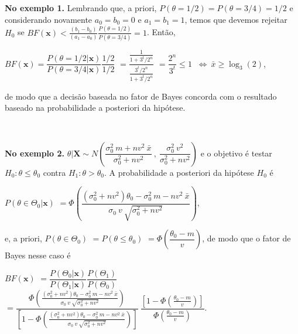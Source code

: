 \documentclass[
]{book}
\begin{document}
\textbf{No exemplo 1.} Lembrando que, a priori, \(P(\theta=1/2)=P(\theta=3/4)=1/2\) e considerando novamente \(a_0=b_0=0\) e \(a_1=b_1=1\), temos que devemos rejeitar \(H_0\) se \(BF(\boldsymbol x)<\frac{(b_1-b_0)}{(a_1-a_0)}\frac{P(\theta=1/2)}{P(\theta=3/4)}=1\). Então,

\(BF(\boldsymbol x)=\dfrac{P(\theta=1/2|\boldsymbol x)}{P(\theta=3/4|\boldsymbol x)}\dfrac{1/2}{1/2}\) \(=\dfrac{\frac{1}{1+3^t/2^n}}{\frac{3^t/2^n}{1+3^t/2^n}}\) \(=\dfrac{2^n}{3^t}\leq 1\) \(~\Longleftrightarrow~ \bar{x} \geq \log_3(2)\),

de modo que a decisão baseada no fator de Bayes concorda com o resultado baseado na probabilidade a posteriori da hipótese.

\(~\)

\textbf{No exemplo 2.} \(\theta|\boldsymbol X \sim N\left(\dfrac{{\sigma}_0^2~m+nv^2~\bar x}{{\sigma}_0^2+nv^2}~,~\dfrac{{\sigma}_0^2~v^2}{{\sigma}_0^2+nv^2}\right)\) e o objetivo é testar \(H_0: \theta\leq \theta_0\) contra \(H_1:\theta > \theta_0\). A probabilidade a posteriori da hipótese \(H_0\) é

\(P\left(\theta\in\Theta_0|\boldsymbol x\right)\)
\(= \Phi\left(\dfrac{({\sigma}_0^2+nv^2)\theta_0-{\sigma}_0^2~m-nv^2~\bar x}{{\sigma}_0~v~\sqrt{{\sigma}_ 0^2+nv^2}}\right)\),

e, a priori, \(P(\theta \in \Theta_0)\) \(=P(\theta \leq \theta_0)\) \(= \Phi\left(\dfrac{\theta_0-m}{v}\right)\), de modo que o fator de Bayes nesse caso é

\(BF(\boldsymbol x)\)
\(= \dfrac{P(\Theta_0|\boldsymbol x)}{P(\Theta_1|\boldsymbol x)} \dfrac{P(\Theta_1)}{P(\Theta_0)}\)
\(= \dfrac{\Phi\left(\frac{({\sigma}_0^2+nv^2)\theta_0-{\sigma}_0^2~m-nv^2~\bar x}{{\sigma}_0~v~\sqrt{{\sigma}_0^2+nv^2}}\right)}{\left[1-\Phi\left(\frac{({\sigma}_0^2+nv^2)\theta_0-{\sigma}_0^2~m-nv^2~\bar x}{{\sigma}_0~v~\sqrt{{\sigma}_0^2+nv^2}}\right)\right]} ~ \dfrac{\left[1-\Phi\left(\frac{\theta_0-m}{v}\right)\right]}{\Phi\left(\frac{\theta_0-m}{v}\right)}\).

\(~\)
\end{document}
